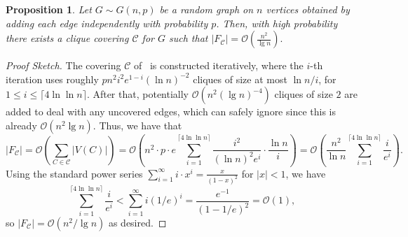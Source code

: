 \documentclass[11pt]{article}
\newtheorem{proposition}[theorem]{Proposition}
\renewcommand{\O}{\mathcal{O}}
\begin{document}
\begin{proposition}\label{prop:random_coverings}
    Let $G \sim G(n, p)$ be a random graph on $n$ vertices obtained by adding each edge independently with probability $p$. Then, with high probability there exists a clique covering $\mathcal{C}$ for $G$ such that 
    \(
        |F_\mathcal{C}| = \O\left(\frac{n^2}{\lg n}\right).
    \)
\end{proposition}
\begin{proof}[Proof Sketch]
    The covering $\mathcal{C}$ of~\citet{frieze2011coveringedgesrandomgraph} is constructed iteratively, where the $i$-th iteration uses roughly
    \(
        p n^2  i^2   e^{1-i}  (\ln n)^{-2}
    \)
    cliques of size at most $\ln n /i$, for $1 \leq i \leq \lceil 4 \ln \ln n\rceil$. After that,  potentially $\O(n^2 (\lg n)^{-4})$ cliques of size $2$ are added to deal with any uncovered edges, which can safely ignore since this is already $\O(n^2 \lg n)$.
    Thus, we have that 
    \[
        |F_\mathcal{C}| = \O\left(\sum_{C \in \mathcal{C}} |V(C)|\right) = \O\left(n^2 \cdot p \cdot e  \sum_{i=1}^{\lceil 4 \ln \ln n\rceil} \frac{i^2}{(\ln n)^2 e^i} \cdot \frac{\ln n}{i} \right) = \O\left(\frac{n^2}{\ln n} \sum_{i=1}^{\lceil 4 \ln \ln n\rceil} \frac{i}{e^i}\right).
    \]
    Using the standard power series $\sum_{i=1}^\infty i \cdot x^i = \frac{x}{(1-x)^2}$ for $|x| < 1$,   we have 
    \[
        \sum_{i=1}^{\lceil 4 \ln \ln n\rceil} \frac{i}{e^i} < \sum_{i=1}^{\infty} i (1/e)^i = \frac{e^{-1}}{(1 - 1/e)^2} = \O(1),
    \]
    so $|F_\mathcal{C}| = \O(n^2 / \lg n)$ as desired.
\end{proof}
\end{document}
